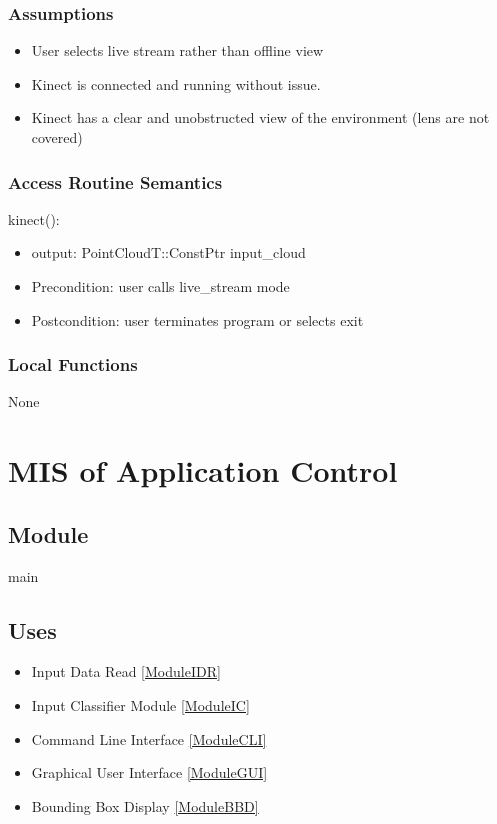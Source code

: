 \documentclass[12pt, titlepage]{article}
\begin{document}
\subsubsection{Assumptions}

\begin{itemize}
  \item User selects live stream rather than offline view
  \item Kinect is connected and running without issue.
  \item Kinect has a clear and unobstructed view of the environment (lens are not covered)
\end{itemize}

\subsubsection{Access Routine Semantics}

\noindent kinect():
\begin{itemize}
  \item output: PointCloudT::ConstPtr input\_cloud
  \item Precondition: user calls live\_stream mode
  \item Postcondition: user terminates program or selects exit 
\end{itemize}

\subsubsection{Local Functions}

None

\newpage

\section{MIS of Application Control} \label{ModuleAC} 

\subsection{Module}

main

\subsection{Uses}

\begin{itemize}
  \item Input Data Read \ref{ModuleIDR}
  \item Input Classifier Module \ref{ModuleIC}
  \item Command Line Interface \ref{ModuleCLI}
  \item Graphical User Interface \ref{ModuleGUI}
  \item Bounding Box Display \ref{ModuleBBD}
\end{itemize}
\end{document}
